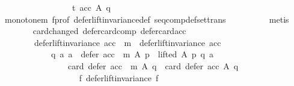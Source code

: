 \begin{isabellebody}
\ \ \ \ \ \ \ \ \ \ \ \ \ \ \ \ {\isasymnot}\ t\ {\isacharparenleft}{\kern0pt}acc\ A\ q{\isacharparenright}{\kern0pt}{\isacharparenright}{\kern0pt}{\isachardoublequoteclose}\isanewline
\ \ \ \ \ \ \ \ \isamarkupfalse%
\ monotone{\isacharunderscore}{\kern0pt}m\ f{\isacharunderscore}{\kern0pt}prof\ defer{\isacharunderscore}{\kern0pt}lift{\isacharunderscore}{\kern0pt}invariance{\isacharunderscore}{\kern0pt}def\ seq{\isacharunderscore}{\kern0pt}comp{\isacharunderscore}{\kern0pt}def{\isacharunderscore}{\kern0pt}set{\isacharunderscore}{\kern0pt}trans\isanewline
\ \ \ \ \ \ \ \ \isamarkupfalse%
\ metis\isanewline
\ \ \ \ \ \ \isamarkupfalse%
\ card{\isacharunderscore}{\kern0pt}changed\ defer{\isacharunderscore}{\kern0pt}card{\isacharunderscore}{\kern0pt}comp\ defer{\isacharunderscore}{\kern0pt}card{\isacharunderscore}{\kern0pt}acc\isanewline
\ \ \ \ \ \ \isamarkupfalse%
\isanewline
\ \ \ \ \ \ \ \ {\isachardoublequoteopen}{\isacharparenleft}{\kern0pt}defer{\isacharunderscore}{\kern0pt}lift{\isacharunderscore}{\kern0pt}invariance\ {\isacharparenleft}{\kern0pt}acc\ {\isasymtriangleright}\ m{\isacharparenright}{\kern0pt}\ {\isasymand}\ defer{\isacharunderscore}{\kern0pt}lift{\isacharunderscore}{\kern0pt}invariance\ {\isacharparenleft}{\kern0pt}acc{\isacharparenright}{\kern0pt}{\isacharparenright}{\kern0pt}\ {\isasymlongrightarrow}\isanewline
\ \ \ \ \ \ \ \ \ \ \ \ {\isacharparenleft}{\kern0pt}{\isasymforall}q\ a{\isachardot}{\kern0pt}\ {\isacharparenleft}{\kern0pt}a\ {\isasymin}\ {\isacharparenleft}{\kern0pt}defer\ {\isacharparenleft}{\kern0pt}acc\ {\isasymtriangleright}\ m{\isacharparenright}{\kern0pt}\ A\ p{\isacharparenright}{\kern0pt}\ {\isasymand}\ lifted\ A\ p\ q\ a{\isacharparenright}{\kern0pt}\ {\isasymlongrightarrow}\isanewline
\ \ \ \ \ \ \ \ \ \ \ \ \ \ \ \ card\ {\isacharparenleft}{\kern0pt}defer\ {\isacharparenleft}{\kern0pt}acc\ {\isasymtriangleright}\ m{\isacharparenright}{\kern0pt}\ A\ q{\isacharparenright}{\kern0pt}\ {\isasymnoteq}\ {\isacharparenleft}{\kern0pt}card\ {\isacharparenleft}{\kern0pt}defer\ acc\ A\ q{\isacharparenright}{\kern0pt}{\isacharparenright}{\kern0pt}{\isacharparenright}{\kern0pt}{\isachardoublequoteclose}\isanewline
\ \ \ \ \ \ \isamarkupfalse%
\ {\isacharminus}{\kern0pt}\isanewline
\ \ \ \ \ \ \ \ \isamarkupfalse%
\isanewline
\ \ \ \ \ \ \ \ \ \ {\isachardoublequoteopen}{\isasymforall}f{\isachardot}{\kern0pt}\ {\isacharparenleft}{\kern0pt}defer{\isacharunderscore}{\kern0pt}lift{\isacharunderscore}{\kern0pt}invariance\ f\ {\isasymor}\isanewline

\end{isabellebody}
